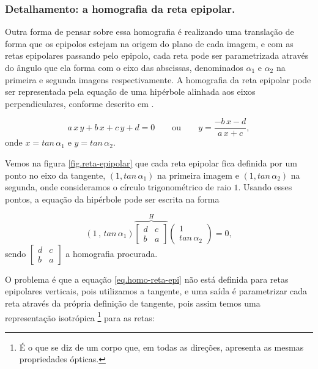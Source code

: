 \subsubsection{Detalhamento: a homografia da reta epipolar.} 


Outra forma de pensar sobre essa homografia é realizando uma translação de forma que os epipolos estejam na origem do plano de cada imagem, e com as retas epipolares passando pelo epipolo, cada reta pode ser parametrizada através do ângulo que ela forma com o eixo das abscissas, denominados $\alpha_1$ e $\alpha_2$ na primeira e segunda imagens respectivamente.
A homografia da reta epipolar pode ser representada pela equação de uma hipérbole alinhada aos eixos perpendiculares, conforme descrito em \cite{Fabbri:Kimia:IJCV2015}.

\begin{equation}\label{eq.hiperbole}
a\,x\,y+b\,x+c\,y+d=0 \qquad \text{ou} \qquad y=\frac{-b\,x-d}{a\,x+c},
\end{equation} 
onde $x=tan\,\alpha_1$ e $y=tan\,\alpha_2$. 

Vemos na figura \ref{fig.reta-epipolar} que cada reta epipolar fica definida por um ponto no eixo da tangente, $(1,tan\,\alpha_1)$ na primeira imagem e $(1,tan\,\alpha_2)$ na segunda, onde consideramos o círculo trigonométrico de raio $1$. Usando esses pontos, a equação da hipérbole pode ser escrita na forma

\begin{equation}\label{eq.homo-reta-epi}
(1\,,\,tan\,\alpha_1)
\overbrace{
\begin{bmatrix}
d&c\\
b&a
\end{bmatrix}
}^{H}
\begin{pmatrix}
1\\
tan\,\alpha_2
\end{pmatrix}
=0,
\end{equation}
sendo 
$\begin{bmatrix}d&c\\b&a\end{bmatrix}$ a homografia procurada.

O problema é que a equação \ref{eq.homo-reta-epi} não está definida para retas epipolares verticais, pois utilizamos a tangente, e uma saída é parametrizar cada reta através da própria definição de tangente, pois assim temos uma representação isotrópica \footnote{É o que se diz de um corpo que, em todas as direções, apresenta as mesmas propriedades ópticas.} para as retas:


